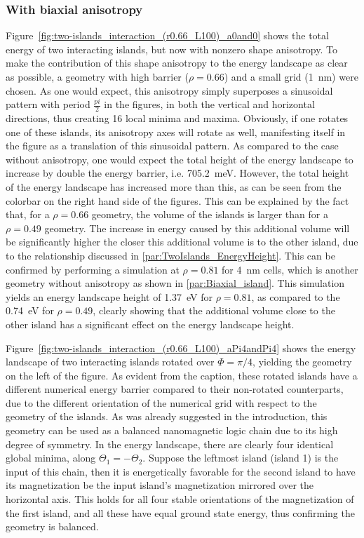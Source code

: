 \documentclass[11pt,a4paper,english]{article}
\begin{document}
\subsubsection{With biaxial anisotropy}
Figure~\ref{fig:two-islands_interaction_(r0.66_L100)_a0and0} shows the total energy of two interacting islands, but now with nonzero shape anisotropy. To make the contribution of this shape anisotropy to the energy landscape as clear as possible, a geometry with high barrier ($\rho=0.66$) and a small grid (\SI{1}{\nano\metre}) were chosen. As one would expect, this anisotropy simply superposes a sinusoidal pattern with period $\frac{pi}{2}$ in the figures, in both the vertical and horizontal directions, thus creating 16 local minima and maxima. Obviously, if one rotates one of these islands, its anisotropy axes will rotate as well, manifesting itself in the figure as a translation of this sinusoidal pattern. As compared to the case without anisotropy, one would expect the total height of the energy landscape to increase by double the energy barrier, i.e. \SI{705.2}{\milli\electronvolt}. However, the total height of the energy landscape has increased more than this, as can be seen from the colorbar on the right hand side of the figures. This can be explained by the fact that, for a $\rho=0.66$ geometry, the volume of the islands is larger than for a $\rho=0.49$ geometry. The increase in energy caused by this additional volume will be significantly higher the closer this additional volume is to the other island, due to the relationship discussed in \cref{par:TwoIslands_EnergyHeight}. This can be confirmed by performing a simulation at $\rho=0.81$ for \SI{4}{\nano\metre} cells, which is another geometry without anisotropy as shown in \cref{par:Biaxial_island}. This simulation yields an energy landscape height of \SI{1.37}{\electronvolt} for $\rho=0.81$, as compared to the \SI{0.74}{\electronvolt} for $\rho=0.49$, clearly showing that the additional volume close to the other island has a significant effect on the energy landscape height. \par
Figure~\ref{fig:two-islands_interaction_(r0.66_L100)_aPi4andPi4} shows the energy landscape of two interacting islands rotated over $\Phi=\pi/4$, yielding the geometry on the left of the figure. As evident from the caption, these rotated islands have a different numerical energy barrier compared to their non-rotated counterparts, due to the different orientation of the numerical grid with respect to the geometry of the islands. As was already suggested in the introduction, this geometry can be used as a balanced nanomagnetic logic chain due to its high degree of symmetry. In the energy landscape, there are clearly four identical global minima, along $\Theta_1 = -\Theta_2$. Suppose the leftmost island (island 1) is the input of this chain, then it is energetically favorable for the second island to have its magnetization be the input island's magnetization mirrored over the horizontal axis. This holds for all four stable orientations of the magnetization of the first island, and all these have equal ground state energy, thus confirming the geometry is balanced.
\end{document}
